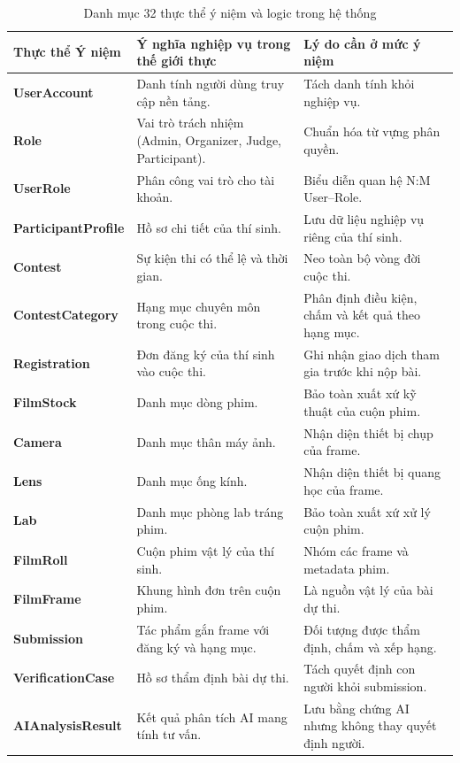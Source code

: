 \begin{table}[!ht]
\centering
\caption{Danh mục 32 thực thể ý niệm và logic trong hệ thống}
\label{tab:c4_entity_inventory}
\scriptsize
\begin{tabularx}{\textwidth}{>{\bfseries}p{3.2cm}p{4.8cm}>{\raggedright\arraybackslash}X}
\toprule
\textbf{Thực thể Ý niệm} & \textbf{Ý nghĩa nghiệp vụ trong thế giới thực} & \textbf{Lý do cần ở mức ý niệm} \\
\midrule
\textbf{UserAccount} & Danh tính người dùng truy cập nền tảng. & Tách danh tính khỏi nghiệp vụ. \\
\textbf{Role} & Vai trò trách nhiệm (Admin, Organizer, Judge, Participant). & Chuẩn hóa từ vựng phân quyền. \\
\textbf{UserRole} & Phân công vai trò cho tài khoản. & Biểu diễn quan hệ N:M User--Role. \\
\textbf{ParticipantProfile} & Hồ sơ chi tiết của thí sinh. & Lưu dữ liệu nghiệp vụ riêng của thí sinh. \\
\textbf{Contest} & Sự kiện thi có thể lệ và thời gian. & Neo toàn bộ vòng đời cuộc thi. \\
\textbf{ContestCategory} & Hạng mục chuyên môn trong cuộc thi. & Phân định điều kiện, chấm và kết quả theo hạng mục. \\
\textbf{Registration} & Đơn đăng ký của thí sinh vào cuộc thi. & Ghi nhận giao dịch tham gia trước khi nộp bài. \\
\textbf{FilmStock} & Danh mục dòng phim. & Bảo toàn xuất xứ kỹ thuật của cuộn phim. \\
\textbf{Camera} & Danh mục thân máy ảnh. & Nhận diện thiết bị chụp của frame. \\
\textbf{Lens} & Danh mục ống kính. & Nhận diện thiết bị quang học của frame. \\
\textbf{Lab} & Danh mục phòng lab tráng phim. & Bảo toàn xuất xứ xử lý cuộn phim. \\
\textbf{FilmRoll} & Cuộn phim vật lý của thí sinh. & Nhóm các frame và metadata phim. \\
\textbf{FilmFrame} & Khung hình đơn trên cuộn phim. & Là nguồn vật lý của bài dự thi. \\
\textbf{Submission} & Tác phẩm gắn frame với đăng ký và hạng mục. & Đối tượng được thẩm định, chấm và xếp hạng. \\
\textbf{VerificationCase} & Hồ sơ thẩm định bài dự thi. & Tách quyết định con người khỏi submission. \\
\textbf{AIAnalysisResult} & Kết quả phân tích AI mang tính tư vấn. & Lưu bằng chứng AI nhưng không thay quyết định người. \\

\end{tabularx}
\end{table}
